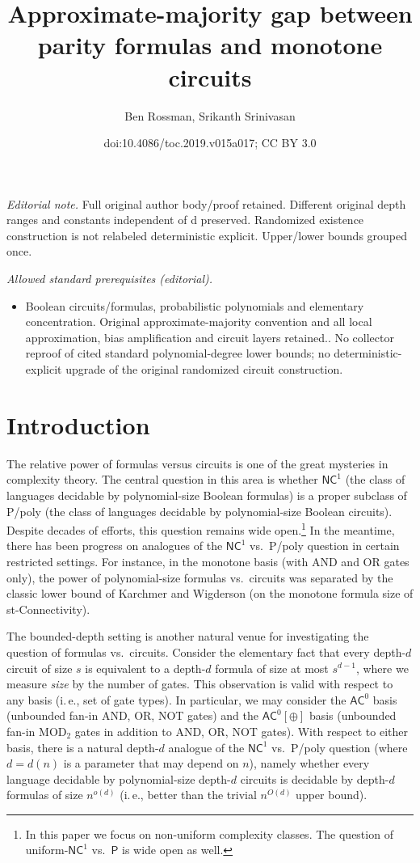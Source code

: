 \documentclass[11pt]{article}
\title{Approximate-majority gap between parity formulas and monotone circuits}
\author{Ben Rossman, Srikanth Srinivasan}
\date{doi:10.4086/toc.2019.v015a017; CC BY 3.0}
\numberwithin{equation}{section}
\theoremstyle{definition}
\theoremstyle{plain}
\newcommand{\cclass}[1]{\textsf{#1}}
\newcommand{\ie}{i.\,e.}
\newcommand{\AC}{\cclass{AC}}
\newcommand{\NC}{\cclass{NC}}
\begin{document}
\maketitle
\noindent\textit{Editorial note.} Full original author body/proof retained. Different original depth ranges and constants independent of d preserved. Randomized existence construction is not relabeled deterministic explicit. Upper/lower bounds grouped once.\par\medskip
\noindent\textit{Allowed standard prerequisites (editorial).}\begin{itemize}
\item Boolean circuits/formulas, probabilistic polynomials and elementary concentration. Original approximate-majority convention and all local approximation, bias amplification and circuit layers retained.. No collector reproof of cited standard polynomial-degree lower bounds; no deterministic-explicit upgrade of the original randomized circuit construction.
\end{itemize}\medskip
\section{Introduction}

The relative power of formulas versus circuits is one of the great mysteries in complexity \mbox{theory}. The central question in this area is whether $\NC^1$ (the class of languages decidable by polynomial-size Boolean formulas) is a proper subclass of P/poly (the class of languages decidable by polynomial-size Boolean circuits). Despite decades of efforts, this question remains wide open.\footnote{In this paper we focus on non-uniform complexity classes. The question of uniform-$\NC^1$ vs.\ $\cclass{P}$ is wide open as well.}
In the meantime, there has been progress on analogues of the $\NC^1$ vs.\ \cclass{P}/poly question in certain restricted settings. For instance, in the monotone basis (with AND and OR gates only), the power of polynomial-size formulas vs.\ circuits was separated by the classic lower bound of Karchmer and Wigderson \cite{karchmer1990monotone} (on the monotone formula size of st-Connectivity).

The bounded-depth setting is another natural venue for investigating
the question of %
formulas  %
vs.\ circuits. Consider the elementary fact that every depth-$d$ circuit of size $s$ is equivalent to a depth-$d$ formula of size at most $s^{d-1}$, where we measure \emph{size} by the number of gates. This observation is valid with respect to any basis (\ie, set of gate types). In particular, we may consider the $\AC^0$ basis (unbounded fan-in AND, OR, NOT gates) and the $\AC^0[\oplus]$ basis (unbounded fan-in MOD$_2$ gates in addition to AND, OR, NOT gates). With respect to either basis, there is a natural depth-$d$ analogue of the $\NC^1$ vs.\ \cclass{P}/poly question (where $d = d(n)$ is a parameter that may depend on $n$), namely whether every language decidable by polynomial-size depth-$d$ circuits is decidable by depth-$d$ formulas of size $n^{o(d)}$ (\ie, better than the trivial $n^{O(d)}$ upper bound).
\end{document}
